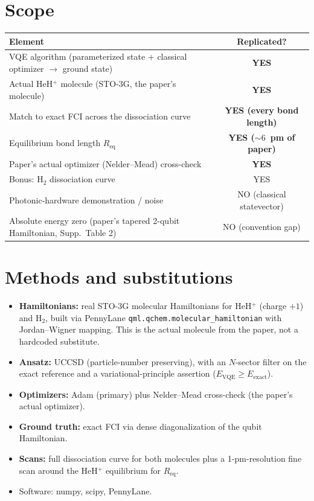 \documentclass[11pt]{article}
\begin{document}
\section{Scope}
\begin{center}
\begin{tabular}{lc}
\toprule
Element & Replicated? \\
\midrule
VQE algorithm (parameterized state + classical optimizer $\rightarrow$ ground state) & \textbf{YES} \\
Actual HeH$^+$ molecule (STO-3G, the paper's molecule) & \textbf{YES} \\
Match to exact FCI across the dissociation curve & \textbf{YES (every bond length)} \\
Equilibrium bond length $R_\mathrm{eq}$ & \textbf{YES ($\sim6$~pm of paper)} \\
Paper's actual optimizer (Nelder--Mead) cross-check & \textbf{YES} \\
Bonus: H$_2$ dissociation curve & YES \\
Photonic-hardware demonstration / noise & NO (classical statevector) \\
Absolute energy zero (paper's tapered 2-qubit Hamiltonian, Supp.\ Table 2) & NO (convention gap) \\
\bottomrule
\end{tabular}
\end{center}

\section{Methods and substitutions}
\begin{itemize}
    \item \textbf{Hamiltonians:} real STO-3G molecular Hamiltonians for HeH$^+$ (charge $+1$) and H$_2$, built via PennyLane \verb|qml.qchem.molecular_hamiltonian| with Jordan--Wigner mapping. This is the actual molecule from the paper, not a hardcoded substitute.
    \item \textbf{Ansatz:} UCCSD (particle-number preserving), with an $N$-sector filter on the exact reference and a variational-principle assertion ($E_\mathrm{VQE} \geq E_\mathrm{exact}$).
    \item \textbf{Optimizers:} Adam (primary) plus Nelder--Mead cross-check (the paper's actual optimizer).
    \item \textbf{Ground truth:} exact FCI via dense diagonalization of the qubit Hamiltonian.
    \item \textbf{Scans:} full dissociation curve for both molecules plus a 1-pm-resolution fine scan around the HeH$^+$ equilibrium for $R_\mathrm{eq}$.
    \item Software: numpy, scipy, PennyLane.
\end{itemize}
\end{document}
